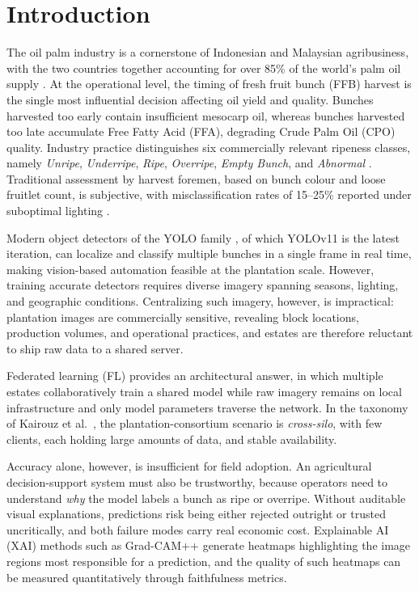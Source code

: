 \documentclass[conference, compsoc, twoside]{IEEEtran}
\begin{document}
\section{Introduction}
The oil palm industry is a cornerstone of Indonesian and Malaysian agribusiness, with the two countries together accounting for over 85\% of the world's palm oil supply \cite{usda2024}. At the operational level, the timing of fresh fruit bunch (FFB) harvest is the single most influential decision affecting oil yield and quality. Bunches harvested too early contain insufficient mesocarp oil, whereas bunches harvested too late accumulate Free Fatty Acid (FFA), degrading Crude Palm Oil (CPO) quality. Industry practice distinguishes six commercially relevant ripeness classes, namely \textit{Unripe}, \textit{Underripe}, \textit{Ripe}, \textit{Overripe}, \textit{Empty Bunch}, and \textit{Abnormal} \cite{junos2022}. Traditional assessment by harvest foremen, based on bunch colour and loose fruitlet count, is subjective, with misclassification rates of 15--25\% reported under suboptimal lighting \cite{sabri2017}.

Modern object detectors of the YOLO family \cite{yolo_redmon}, of which YOLOv11 \cite{yolov11} is the latest iteration, can localize and classify multiple bunches in a single frame in real time, making vision-based automation feasible at the plantation scale. However, training accurate detectors requires diverse imagery spanning seasons, lighting, and geographic conditions. Centralizing such imagery, however, is impractical: plantation images are commercially sensitive, revealing block locations, production volumes, and operational practices, and estates are therefore reluctant to ship raw data to a shared server.

Federated learning (FL) \cite{fedavg} provides an architectural answer, in which multiple estates collaboratively train a shared model while raw imagery remains on local infrastructure and only model parameters traverse the network. In the taxonomy of Kairouz et al.\ \cite{kairouz2021}, the plantation-consortium scenario is \textit{cross-silo}, with few clients, each holding large amounts of data, and stable availability.

Accuracy alone, however, is insufficient for field adoption. An agricultural decision-support system must also be trustworthy, because operators need to understand \textit{why} the model labels a bunch as ripe or overripe. Without auditable visual explanations, predictions risk being either rejected outright or trusted uncritically, and both failure modes carry real economic cost. Explainable AI (XAI) methods such as Grad-CAM++ \cite{gradcampp} generate heatmaps highlighting the image regions most responsible for a prediction, and the quality of such heatmaps can be measured quantitatively through faithfulness metrics.
\end{document}
